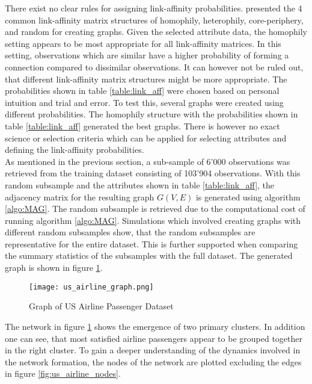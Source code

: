   \noindent There exist no clear rules for assigning link-affinity
  probabilities. \citeauthor{kim2012multiplicative} 
  \citeyearpar[p. 118]{kim2012multiplicative} presented the 4 common 
  link-affinity matrix structures of homophily, heterophily, core-periphery, and 
  random for creating graphs. Given the selected attribute data, the homophily 
  setting appears to be most appropriate for all link-affinity matrices. In this 
  setting, observations which are similar have a higher probability of forming a 
  connection compared to dissimilar observations. It can however not be ruled out, 
  that different link-affinity matrix structures might be more appropriate. The 
  probabilities shown in table \ref{table:link_aff} were chosen based on 
  personal intuition and trial and error. To test this, several graphs were 
  created using different probabilities. The homophily structure with the 
  probabilities shown in table \ref{table:link_aff} generated the best 
  graphs. There is however no exact science or selection criteria which can be 
  applied for selecting attributes and defining the link-affinity probabilities. \\

  \noindent As mentioned in the previous section, a sub-sample of 6'000 
  observations was retrieved from the training dataset consisting of 103’904 
  observations. With this random subsample and the attributes shown in table
  \ref{table:link_aff}, the adjacency matrix for the resulting graph $G(V,E)$ 
  is generated using algorithm \ref{algo:MAG}. The random subsample is 
  retrieved due to the computational cost of running algorithm \ref{algo:MAG}. 
  Simulations which involved creating graphs with different random subsamples 
  show, that the random subsamples are representative for the entire dataset. 
  This is further supported when comparing the summary statistics of the 
  subsamples with the full dataset. The generated graph is shown in figure 
  \ref{fig:us_airline_graph}.

  \begin{figure}[h]
	  \centering
	  \texttt{[image: us\_airline\_graph.png]}
	  \caption{Graph of US Airline Passenger Dataset}
      \label{fig:us_airline_graph}
  \end{figure}
  
  \noindent The network in figure \ref{fig:us_airline_graph} shows the 
  emergence of two primary clusters. In addition one can see, that most satisfied 
  airline passengers appear to be grouped together in the right cluster. To 
  gain a deeper understanding of the dynamics involved in the network formation, 
  the nodes of the network are plotted excluding the edges in figure
  \ref{fig:us_airline_nodes}.


